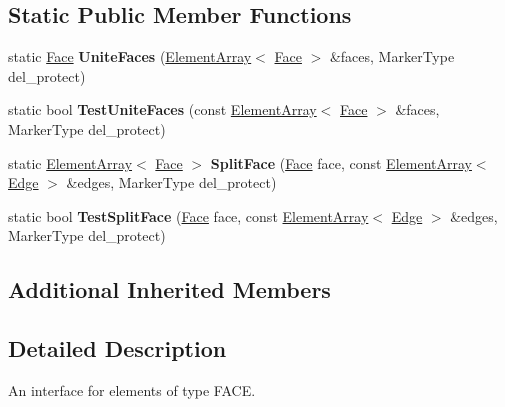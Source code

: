 \subsection*{Static Public Member Functions}
\begin{DoxyCompactItemize}
\item 
\hypertarget{classINMOST_1_1Face_a0da6611e6eb20b2dd0f7e01617431c60}{static \hyperlink{classINMOST_1_1Face}{Face} {\bfseries Unite\-Faces} (\hyperlink{classINMOST_1_1ElementArray}{Element\-Array}$<$ \hyperlink{classINMOST_1_1Face}{Face} $>$ \&faces, Marker\-Type del\-\_\-protect)}\label{classINMOST_1_1Face_a0da6611e6eb20b2dd0f7e01617431c60}

\item 
\hypertarget{classINMOST_1_1Face_ad1d2622f4dda9c86a9c2183364afd50c}{static bool {\bfseries Test\-Unite\-Faces} (const \hyperlink{classINMOST_1_1ElementArray}{Element\-Array}$<$ \hyperlink{classINMOST_1_1Face}{Face} $>$ \&faces, Marker\-Type del\-\_\-protect)}\label{classINMOST_1_1Face_ad1d2622f4dda9c86a9c2183364afd50c}

\item 
\hypertarget{classINMOST_1_1Face_aef8f16b0fcae39923a0cb7194bfce778}{static \hyperlink{classINMOST_1_1ElementArray}{Element\-Array}$<$ \hyperlink{classINMOST_1_1Face}{Face} $>$ {\bfseries Split\-Face} (\hyperlink{classINMOST_1_1Face}{Face} face, const \hyperlink{classINMOST_1_1ElementArray}{Element\-Array}$<$ \hyperlink{classINMOST_1_1Edge}{Edge} $>$ \&edges, Marker\-Type del\-\_\-protect)}\label{classINMOST_1_1Face_aef8f16b0fcae39923a0cb7194bfce778}

\item 
\hypertarget{classINMOST_1_1Face_a44249a6794cf295d698027b6a52c91a8}{static bool {\bfseries Test\-Split\-Face} (\hyperlink{classINMOST_1_1Face}{Face} face, const \hyperlink{classINMOST_1_1ElementArray}{Element\-Array}$<$ \hyperlink{classINMOST_1_1Edge}{Edge} $>$ \&edges, Marker\-Type del\-\_\-protect)}\label{classINMOST_1_1Face_a44249a6794cf295d698027b6a52c91a8}

\end{DoxyCompactItemize}
\subsection*{Additional Inherited Members}


\subsection{Detailed Description}
An interface for elements of type F\-A\-C\-E. 

